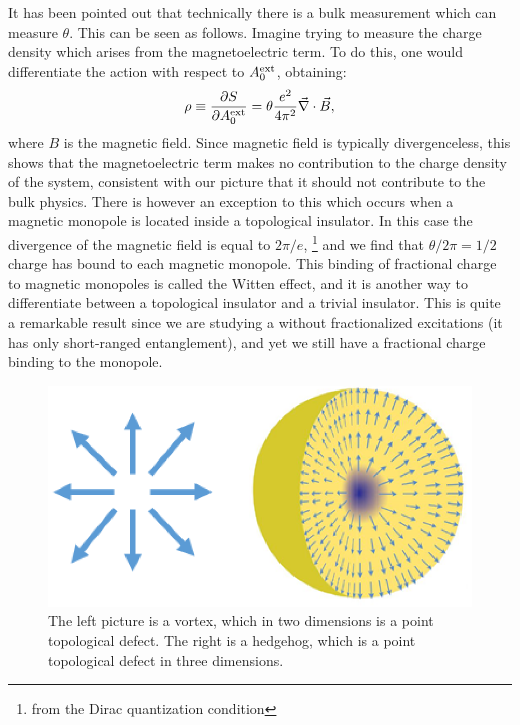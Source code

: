 It has been pointed out \cite{FranzWitten} that technically there is a bulk measurement which can measure $\theta$. This can be seen as follows. Imagine trying to measure the charge density which arises from the magnetoelectric term. To do this, one would differentiate the action with respect to $A^{\rm ext}_0$, obtaining:
\begin{equation}
\rho\equiv\frac{\partial S}{\partial A^{\rm ext}_0}=\theta\frac{e^2}{4\pi^2}\vec{\nabla}\cdot \vec{B},
\end{equation}
where $B$ is the magnetic field. Since magnetic field is typically divergenceless, this shows that the magnetoelectric term makes no contribution to the charge density of the system, consistent with our picture that it should not contribute to the bulk physics. There is however an exception to this which occurs when a magnetic monopole is located inside a topological insulator. In this case the divergence of the magnetic field is equal to $2\pi/e$,
\footnote{from the Dirac quantization condition}
 and we find that $\theta/2\pi=1/2$ charge has bound to each magnetic monopole. This binding of fractional charge to magnetic monopoles is called the Witten effect, and it is another way to differentiate between a topological insulator and a trivial insulator. This is quite a remarkable result since we are studying a without fractionalized excitations (it has only short-ranged entanglement), and yet we still have a fractional charge binding to the monopole.

\begin{figure}
\includegraphics[width=\linewidth]{figures/defects.eps}
\caption{ The left picture is a vortex, which in two dimensions is a point topological defect. The right is a hedgehog, which is a point topological defect in three dimensions.
\label{topo_defects}}
\end{figure}

